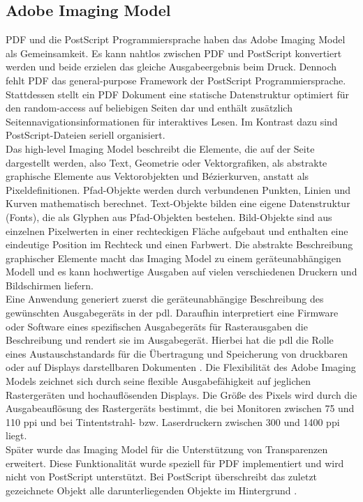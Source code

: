 \subsection{Adobe Imaging Model}
PDF und die PostScript Programmiersprache haben das Adobe Imaging Model als Gemeinsamkeit. Es kann nahtlos zwischen PDF und PostScript konvertiert werden und beide erzielen das gleiche Ausgabeergebnis beim Druck. Dennoch fehlt PDF das general-purpose Framework der PostScript Programmiersprache. Stattdessen stellt ein PDF Dokument eine statische Datenstruktur optimiert für den random-access auf beliebigen Seiten dar und enthält zusätzlich Seitennavigationsinformationen für interaktives Lesen. Im Kontrast dazu sind PostScript-Dateien seriell organisiert. \\
Das high-level Imaging Model beschreibt die Elemente, die auf der Seite dargestellt werden, also Text, Geometrie oder Vektorgrafiken, als abstrakte graphische Elemente aus Vektorobjekten und Bézierkurven, anstatt als Pixeldefinitionen. Pfad-Objekte werden durch verbundenen Punkten, Linien und Kurven mathematisch berechnet. Text-Objekte bilden eine eigene Datenstruktur (Fonts), die als Glyphen aus Pfad-Objekten bestehen. Bild-Objekte sind aus einzelnen Pixelwerten in einer rechteckigen Fläche aufgebaut und enthalten eine eindeutige Position im Rechteck und einen Farbwert. Die abstrakte Beschreibung graphischer Elemente macht das Imaging Model zu einem geräteunabhängigen Modell und es kann hochwertige Ausgaben auf vielen verschiedenen Druckern und Bildschirmen liefern. \\
Eine Anwendung generiert zuerst die geräteunabhängige Beschreibung des gewünschten Ausgabegeräts in der \gls{pdl}. Daraufhin interpretiert eine Firmware oder Software eines spezifischen Ausgabegeräts für Rasterausgaben die Beschreibung und rendert sie im Ausgabegerät. Hierbei hat die \gls{pdl} die Rolle eines Austauschstandards für die Übertragung und Speicherung von druckbaren oder auf Displays darstellbaren Dokumenten \cite{adobe-postscript}. Die Flexibilität des Adobe Imaging Models zeichnet sich durch seine flexible Ausgabefähigkeit auf jeglichen Rastergeräten und hochauflösenden Displays. Die Größe des Pixels wird durch die Ausgabeauflösung des Rastergeräts bestimmt, die bei Monitoren zwischen 75 und 110 \gls{ppi} und bei Tintentstrahl- bzw. Laserdruckern zwischen 300 und 1400 \gls{ppi} liegt. \\
Später wurde das Imaging Model für die Unterstützung von Transparenzen erweitert. Diese Funktionalität wurde speziell für PDF implementiert und wird nicht von PostScript unterstützt. Bei PostScript überschreibt das zuletzt gezeichnete Objekt alle darunterliegenden Objekte im Hintergrund \cite{schneeberger}. 


